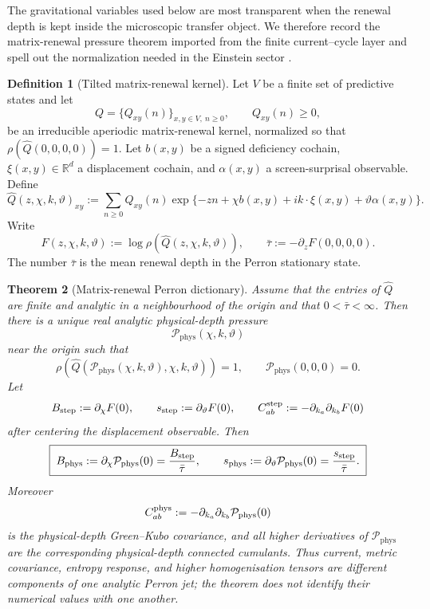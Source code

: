 \documentclass[11pt]{article}
\newtheorem{theorem}{Theorem}[section]
\theoremstyle{definition}
\newtheorem{definition}[theorem]{Definition}
\theoremstyle{remark}
\newcommand{\R}{\mathbb R}
\newcommand{\Bstep}{B_{\mathrm{step}}}
\newcommand{\Bphys}{B_{\mathrm{phys}}}
\newcommand{\bartau}{\bar\tau}
\newcommand{\Qhat}{\widehat Q}
\newcommand{\Pphys}{\mathcal P_{\mathrm{phys}}}
\begin{document}
The gravitational variables used below are most transparent when the renewal
depth is kept inside the microscopic transfer object.  We therefore record the
matrix-renewal pressure theorem imported from the finite current--cycle layer
and spell out the normalization needed in the Einstein sector
\cite{PelissierCurrentsK4Arxiv}.

\begin{definition}[Tilted matrix-renewal kernel]
\label{def:tilted-matrix-renewal}
Let \(V\) be a finite set of predictive states and let
\[
   Q=\{Q_{xy}(n)\}_{x,y\in V,\ n\ge0},
   \qquad Q_{xy}(n)\ge0,
\]
be an irreducible aperiodic matrix-renewal kernel, normalized so that
\(\rho(\Qhat(0,0,0,0))=1\).  Let \(b(x,y)\) be a signed deficiency cochain,
\(\xi(x,y)\in\R^d\) a displacement cochain, and
\(\alpha(x,y)\) a screen-surprisal observable.  Define
\[
 \Qhat(z,\chi,k,\vartheta)_{xy}
 :=
 \sum_{n\ge0}Q_{xy}(n)
 \exp\{-zn+\chi b(x,y)+ik\cdot\xi(x,y)+\vartheta\alpha(x,y)\}.
\]
Write
\[
 F(z,\chi,k,\vartheta)
 :=
 \log\rho\!\left(\Qhat(z,\chi,k,\vartheta)\right),
 \qquad
 \bartau:=-\partial_zF(0,0,0,0).
\]
The number \(\bartau\) is the mean renewal depth in the Perron stationary
state.
\end{definition}

\begin{theorem}[Matrix-renewal Perron dictionary]
\label{thm:matrix-renewal-dictionary}
Assume that the entries of \(\Qhat\) are finite and analytic in a neighbourhood
of the origin and that \(0<\bartau<\infty\).  Then there is a unique real
analytic physical-depth pressure
\[
   \Pphys(\chi,k,\vartheta)
\]
near the origin such that
\[
 \rho\!\left(
 \Qhat(\Pphys(\chi,k,\vartheta),\chi,k,\vartheta)
 \right)=1,
 \qquad
 \Pphys(0,0,0)=0.
\]
Let
\[
 \Bstep:=\partial_\chi F(0),\qquad
 s_{\rm step}:=\partial_\vartheta F(0),
 \qquad
 C^{\rm step}_{ab}:=-\partial_{k_a}\partial_{k_b}F(0)
\]
after centering the displacement observable.  Then
\[
 \boxed{\;
 \Bphys:=\partial_\chi\Pphys(0)
       =\frac{\Bstep}{\bartau},
 \qquad
 s_{\rm phys}:=\partial_\vartheta\Pphys(0)
       =\frac{s_{\rm step}}{\bartau}. \;}
\]
Moreover
\[
 C^{\rm phys}_{ab}
 :=
 -\partial_{k_a}\partial_{k_b}\Pphys(0)
\]
is the physical-depth Green--Kubo covariance, and all higher derivatives of
\(\Pphys\) are the corresponding physical-depth connected cumulants.  Thus
current, metric covariance, entropy response, and higher homogenisation
tensors are different components of one analytic Perron jet; the theorem does
not identify their numerical values with one another.
\end{theorem}
\end{document}
